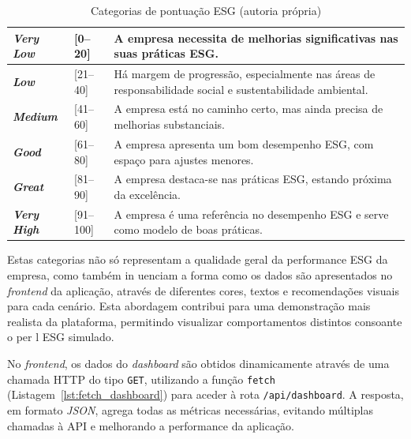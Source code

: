 \begin{table}[H]
    \renewcommand{\arraystretch}{1.3}
    \setlength{\tabcolsep}{10pt}
    \centering
    \begin{tabular}{|>{\bfseries}p{2cm} |p{1.5cm} |p{9cm}|}
      \hline
        \rowcolor{red!50} 
        \textit{Very Low} & [0--20] & A empresa necessita de melhorias significativas nas suas práticas ESG. \\
              \hline
        \rowcolor{red!35} 
        \textit{Low} & [21--40] & Há margem de progressão, especialmente nas áreas de responsabilidade social e sustentabilidade ambiental. \\
              \hline
        \rowcolor{yellow!55!orange!30} 
        \textit{Medium} & [41--60] & A empresa está no caminho certo, mas ainda precisa de melhorias substanciais. \\
              \hline
        \rowcolor{green!25} 
        \textit{Good} & [61--80] & A empresa apresenta um bom desempenho ESG, com espaço para ajustes menores. \\
              \hline
        \rowcolor{teal!30!green!50} 
        \textit{Great} & [81--90] & A empresa destaca-se nas práticas ESG, estando próxima da excelência. \\
              \hline
        \rowcolor{teal!40!green!70} 
        \textit{Very High} & [91--100] & A empresa é uma referência no desempenho ESG e serve como modelo de boas práticas. \\
              \hline
    \end{tabular}
    \caption{Categorias de pontuação ESG (autoria própria)}
    \label{tab:esg_categories}
\end{table}

Estas categorias não só representam a qualidade geral da performance ESG da empresa, como também in uenciam a forma como os dados são apresentados no \textit{frontend} da aplicação, através de diferentes cores, textos e recomendações visuais para cada cenário. Esta abordagem contribui para uma demonstração mais realista da plataforma, permitindo visualizar comportamentos distintos consoante o per l ESG simulado.

No \textit{frontend}, os dados do \textit{dashboard} são obtidos dinamicamente através de uma chamada HTTP do tipo \texttt{GET}, utilizando a função \texttt{fetch} (Listagem~\ref{lst:fetch_dashboard}) para aceder à rota \texttt{/api/dashboard}. A resposta, em formato \textit{\gls{JSON}}, agrega todas as métricas necessárias, evitando múltiplas chamadas à API e melhorando a performance da aplicação.


